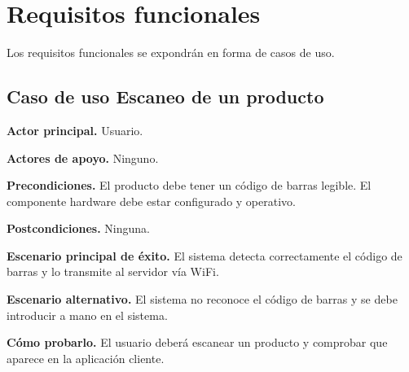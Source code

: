 \section{Requisitos funcionales}

Los requisitos funcionales se expondrán en forma de casos de uso.

\subsection{Caso de uso Escaneo de un producto}

\textbf{Actor principal.} Usuario.

\textbf{Actores de apoyo.} Ninguno.

\textbf{Precondiciones.} El producto debe tener un código de barras legible. El componente hardware debe estar configurado y operativo.

\textbf{Postcondiciones.} Ninguna.

\textbf{Escenario principal de éxito.} El sistema detecta correctamente el código de barras y lo transmite al servidor vía WiFi.

\textbf{Escenario alternativo.} El sistema no reconoce el código de barras y se debe introducir a mano en el sistema.

\textbf{Cómo probarlo.} El usuario deberá escanear un producto y comprobar que aparece en la aplicación cliente.
